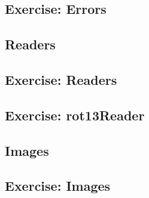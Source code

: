 \subsection{Exercise: Errors}


% 

\subsection{Readers}




\subsection{Exercise: Readers}


% 

\subsection{Exercise: rot13Reader}


% 

\subsection{Images}




\subsection{Exercise: Images}


% 

